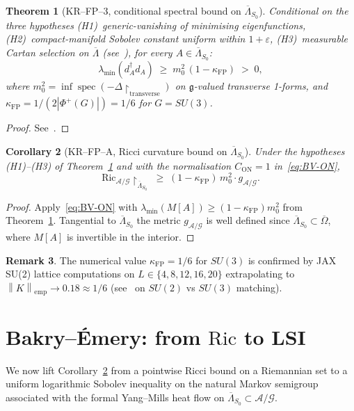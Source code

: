 \documentclass[11pt,a4paper]{amsart}
\newtheorem{theorem}{Theorem}[section]
\newtheorem{corollary}[theorem]{Corollary}
\theoremstyle{definition}
\newtheorem{remark}[theorem]{Remark}
\newcommand{\gfrak}{\mathfrak{g}}
\newcommand{\norm}[1]{\left\lVert#1\right\rVert}
\newcommand{\Ric}{\mathrm{Ric}}
\DeclareMathOperator{\spec}{spec}
\newcommand{\kFP}{\kappa_{\mathrm{FP}}}
\begin{document}
\begin{theorem}[KR--FP--3, conditional spectral bound on $\overline\Lambda_{S_0}$]
\label{thm:KRFP3}
Conditional on the three hypotheses (H1)~generic-vanishing of minimising
eigenfunctions, (H2)~compact-manifold Sobolev constant uniform within
$1+\varepsilon$, (H3)~measurable Cartan selection on $\overline\Lambda$
(see~\cite[Remark~5.3 (Status of (H1)--(H3))]{RemondiereKRFP3_2026}),
for every
$A \in \overline\Lambda_{S_0}$:
$$
\lambda_{\min}(d_A^\dagger d_A) \;\geq\; m_0^2\,(1-\kFP) \;>\; 0,
$$
where $m_0^2 = \inf\spec(-\Delta\restriction_\mathrm{transverse})$ on
$\gfrak$-valued transverse 1-forms, and
$\kFP = 1/(2|\Phi^+(G)|) = 1/6$ for $G=SU(3)$.
\end{theorem}
\begin{proof}
See~\cite{RemondiereKRFP3_2026}.
\end{proof}

\begin{corollary}[KR--FP--A, Ricci curvature bound on $\overline\Lambda_{S_0}$]
\label{cor:KRFPA}
Under the hypotheses (H1)--(H3) of Theorem~\ref{thm:KRFP3} and with the
normalisation $C_\mathrm{ON} = 1$ in~\eqref{eq:BV-ON},
$$
\Ric_{\mathcal A/\mathcal G}\restriction_{\overline\Lambda_{S_0}}
\;\geq\; (1-\kFP)\,m_0^2 \cdot g_{\mathcal A/\mathcal G}.
$$
\end{corollary}
\begin{proof}
Apply~\eqref{eq:BV-ON} with $\lambda_{\min}(M[A]) \geq (1-\kFP) m_0^2$ from
Theorem~\ref{thm:KRFP3}. Tangential to $\overline\Lambda_{S_0}$ the
metric $g_{\mathcal A/\mathcal G}$ is well defined since
$\overline\Lambda_{S_0}\subset\overline\Omega$, where $M[A]$ is invertible
in the interior.
\end{proof}

\begin{remark}
The numerical value $\kFP = 1/6$ for $SU(3)$ is confirmed by JAX SU(2)
lattice computations on $L\in\{4,8,12,16,20\}$ extrapolating to
$\norm{K}_\mathrm{emp} \to 0.18 \approx 1/6$
(see~\cite[\S 6 (Numerical observations), Caveat~1]{RemondiereKRFP3_2026}
on $SU(2)$ vs $SU(3)$ matching).
\end{remark}

\section{Bakry--\'Emery: from $\Ric$ to LSI}\label{sec:bakry}

We now lift Corollary~\ref{cor:KRFPA} from a pointwise Ricci bound on a
Riemannian set to a uniform logarithmic Sobolev inequality on the natural
Markov semigroup associated with the formal Yang--Mills heat flow on
$\overline\Lambda_{S_0}\subset\mathcal A/\mathcal G$.
\end{document}
